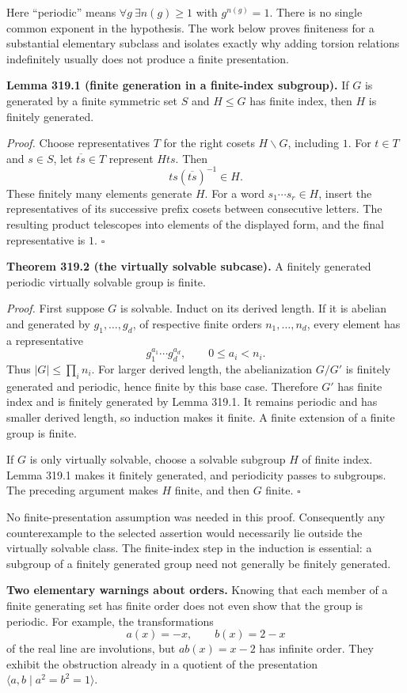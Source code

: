 \documentclass[11pt]{article}
\begin{document}
Here ``periodic'' means $\forall g\ \exists n(g)\geq1$ with $g^{n(g)}=1$. There is no single common exponent in the hypothesis. The work below proves finiteness for a substantial elementary subclass and isolates exactly why adding torsion relations indefinitely usually does not produce a finite presentation.

\textbf{Lemma 319.1 (finite generation in a finite-index subgroup).} If $G$ is generated by a finite symmetric set $S$ and $H\leq G$ has finite index, then $H$ is finitely generated.

\emph{Proof.} Choose representatives $T$ for the right cosets $H\backslash G$, including $1$. For $t\in T$ and $s\in S$, let $\overline{ts}\in T$ represent $Hts$. Then
\[
 t s(\overline{ts})^{-1}\in H.
\]
These finitely many elements generate $H$. For a word $s_1\cdots s_r\in H$, insert the representatives of its successive prefix cosets between consecutive letters. The resulting product telescopes into elements of the displayed form, and the final representative is $1$. $\square$

\textbf{Theorem 319.2 (the virtually solvable subcase).} A finitely generated periodic virtually solvable group is finite.

\emph{Proof.} First suppose $G$ is solvable. Induct on its derived length. If it is abelian and generated by $g_1,\ldots,g_d$, of respective finite orders $n_1,\ldots,n_d$, every element has a representative
\[
 g_1^{a_1}\cdots g_d^{a_d},\qquad 0\leq a_i<n_i.
\]
Thus $|G|\leq\prod_i n_i$. For larger derived length, the abelianization $G/G'$ is finitely generated and periodic, hence finite by this base case. Therefore $G'$ has finite index and is finitely generated by Lemma 319.1. It remains periodic and has smaller derived length, so induction makes it finite. A finite extension of a finite group is finite.

If $G$ is only virtually solvable, choose a solvable subgroup $H$ of finite index. Lemma 319.1 makes it finitely generated, and periodicity passes to subgroups. The preceding argument makes $H$ finite, and then $G$ finite. $\square$

No finite-presentation assumption was needed in this proof. Consequently any counterexample to the selected assertion would necessarily lie outside the virtually solvable class. The finite-index step in the induction is essential: a subgroup of a finitely generated group need not generally be finitely generated.

\textbf{Two elementary warnings about orders.} Knowing that each member of a finite generating set has finite order does not even show that the group is periodic. For example, the transformations
\[
 a(x)=-x,\qquad b(x)=2-x
\]
of the real line are involutions, but $ab(x)=x-2$ has infinite order. They exhibit the obstruction already in a quotient of the presentation $\langle a,b\mid a^2=b^2=1\rangle$.
\end{document}
